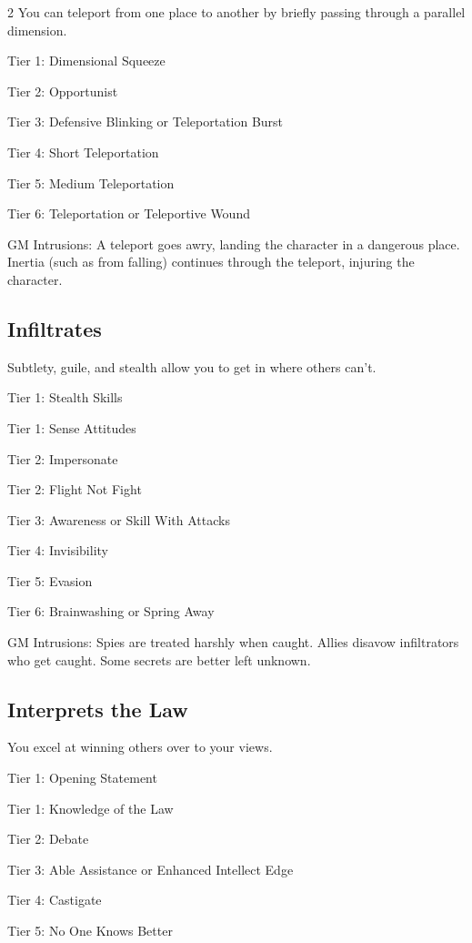 \begin{multicols}{2}
You can teleport from one place to another by briefly passing through a parallel dimension.

Tier 1: Dimensional Squeeze

Tier 2: Opportunist 

Tier 3: Defensive Blinking or Teleportation Burst

Tier 4: Short Teleportation

Tier 5: Medium Teleportation

Tier 6: Teleportation or Teleportive Wound

GM Intrusions: A teleport goes awry, landing the character in a dangerous place. Inertia (such as from falling) continues through the teleport, injuring the character.

\subsection{Infiltrates}

Subtlety, guile, and stealth allow you to get in where others can’t.

Tier 1: Stealth Skills

Tier 1: Sense Attitudes

Tier 2: Impersonate

Tier 2: Flight Not Fight

Tier 3: Awareness or Skill With Attacks

Tier 4: Invisibility

Tier 5: Evasion

Tier 6: Brainwashing or Spring Away

GM Intrusions: Spies are treated harshly when caught. Allies disavow infiltrators who get caught. Some secrets are better left unknown.

\subsection{Interprets the Law}

You excel at winning others over to your views.

Tier 1: Opening Statement

Tier 1: Knowledge of the Law

Tier 2: Debate

Tier 3: Able Assistance or Enhanced Intellect Edge

Tier 4: Castigate

Tier 5: No One Knows Better


\end{multicols}
